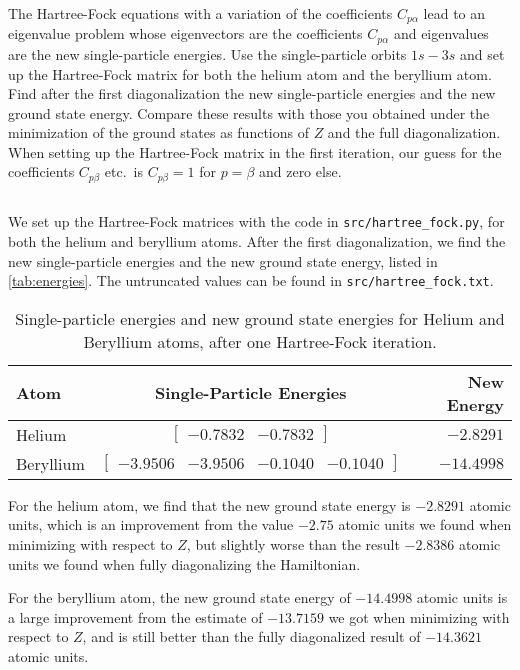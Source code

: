 The Hartree-Fock equations with a variation of the coefficients $C_{p\alpha}$ lead to an eigenvalue problem whose eigenvectors are the coefficients $C_{p\alpha}$ and eigenvalues are the new single-particle energies.
Use the single-particle orbits $1s{-}3s$ and set up the Hartree-Fock matrix for both the helium atom and the beryllium atom.
Find after the first diagonalization the new single-particle energies and the new ground state energy.
Compare these results with those you obtained under the minimization of the ground states as functions of $Z$ and the full diagonalization.
When setting up the Hartree-Fock matrix in the first iteration, our guess for the coefficients $C_{p\beta}$ etc.\ is $C_{p\beta}=1$ for $p=\beta$ and zero else.

\subsection{}
We set up the Hartree-Fock matrices with the code in \verb|src/hartree_fock.py|, for both the helium and beryllium atoms.
After the first diagonalization, we find the new single-particle energies and the new ground state energy, listed in \autoref{tab:energies}.
The untruncated values can be found in \verb|src/hartree_fock.txt|.

\begin{table}[h!]
    \caption{Single-particle energies and new ground state energies for Helium and Beryllium atoms, after one Hartree-Fock iteration.\label{tab:energies}}
    \centering
    \small
    \begin{tabular}{lcr}
        \toprule\toprule
        Atom & Single-Particle Energies & New Energy \\ \midrule
        Helium & $
        \begin{bmatrix}
            -0.7832 & -0.7832
        \end{bmatrix}
        $ & $-2.8291$ \\ \midrule
        Beryllium & $
        \begin{bmatrix}
            -3.9506 & -3.9506 & -0.1040 & -0.1040
        \end{bmatrix}
        $ & $-14.4998$ \\ \bottomrule
    \end{tabular}
\end{table}

For the helium atom, we find that the new ground state energy is $-2.8291$ atomic units, which is an improvement from the value $-2.75$ atomic units we found when minimizing with respect to $Z$, but slightly worse than the result $-2.8386$ atomic units we found when fully diagonalizing the Hamiltonian.

For the beryllium atom, the new ground state energy of $-14.4998$ atomic units is a large improvement from the estimate of $-13.7159$ we got when minimizing with respect to $Z$, and is still better than the fully diagonalized result of $-14.3621$ atomic units.
